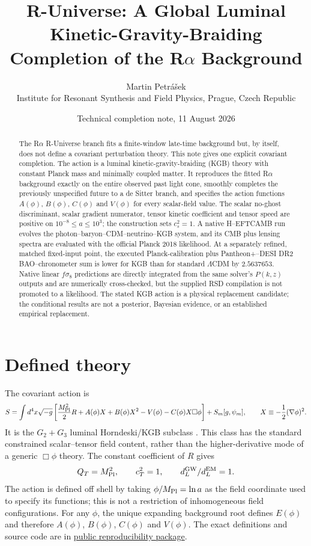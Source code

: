 \documentclass[11pt,a4paper]{article}
\title{\textbf{R-Universe: A Global Luminal Kinetic-Gravity-Braiding Completion of the R$\alpha$ Background}}
\author{Martin Petr\'a\v{s}ek\\
\small Institute for Resonant Synthesis and Field Physics, Prague, Czech Republic}
\date{Technical completion note, 11 August 2026}
\newcommand{\Mpl}{M_{\rm Pl}}
\newcommand{\repo}{\href{https://github.com/MartinPetrasek123/MartinPetrasek123/tree/main/r-universe-global-kgb-completion}{public reproducibility package}}
\begin{document}
\maketitle

\begin{abstract}
The R$\alpha$ R-Universe branch fits a finite-window late-time background but, by itself, does not define a covariant perturbation theory. This note gives one explicit covariant completion. The action is a luminal kinetic-gravity-braiding (KGB) theory with constant Planck mass and minimally coupled matter. It reproduces the fitted R$\alpha$ background exactly on the entire observed past light cone, smoothly completes the previously unspecified future to a de Sitter branch, and specifies the action functions $A(\phi)$, $B(\phi)$, $C(\phi)$ and $V(\phi)$ for every scalar-field value. The scalar no-ghost discriminant, scalar gradient numerator, tensor kinetic coefficient and tensor speed are positive on $10^{-8}\le a\le10^3$; the construction sets $c_s^2=1$. A native H--EFTCAMB run evolves the photon--baryon--CDM--neutrino--KGB system, and its CMB plus lensing spectra are evaluated with the official Planck 2018 likelihood. At a separately refined, matched fixed-input point, the executed Planck-calibration plus Pantheon+--DESI DR2 BAO--chronometer sum is lower for KGB than for standard $\Lambda$CDM by $2.5637653$. Native linear $f\sigma_8$ predictions are directly integrated from the same solver's $P(k,z)$ outputs and are numerically cross-checked, but the supplied RSD compilation is not promoted to a likelihood. The stated KGB action is a physical replacement candidate; the conditional results are not a posterior, Bayesian evidence, or an established empirical replacement.
\end{abstract}

\section{Defined theory}

The covariant action is
\begin{equation}
S=\int d^4x\sqrt{-g}\left[\frac{\Mpl^2}{2}R+A(\phi)X+B(\phi)X^2-V(\phi)-C(\phi)X\Box\phi\right]+S_m[g,\psi_m],
\qquad X\equiv-\frac12(\nabla\phi)^2.
\label{eq:action}
\end{equation}
It is the $G_2+G_3$ luminal Horndeski/KGB subclass \citep{Deffayet2010}.  This
class has the standard constrained scalar--tensor field content, rather than
the higher-derivative mode of a generic $\Box\phi$ theory. The constant coefficient of $R$ gives
\begin{equation}
Q_T=\Mpl^2,\qquad c_T^2=1,\qquad d_L^{\rm GW}/d_L^{\rm EM}=1.
\label{eq:tensor}
\end{equation}
The action is defined off shell by taking $\phi/\Mpl=\ln a$ as the field coordinate used to specify its functions; this is not a restriction of inhomogeneous field configurations. For any $\phi$, the unique expanding background root defines $E(\phi)$ and therefore $A(\phi)$, $B(\phi)$, $C(\phi)$ and $V(\phi)$. The exact definitions and source code are in \repo.
\end{document}
